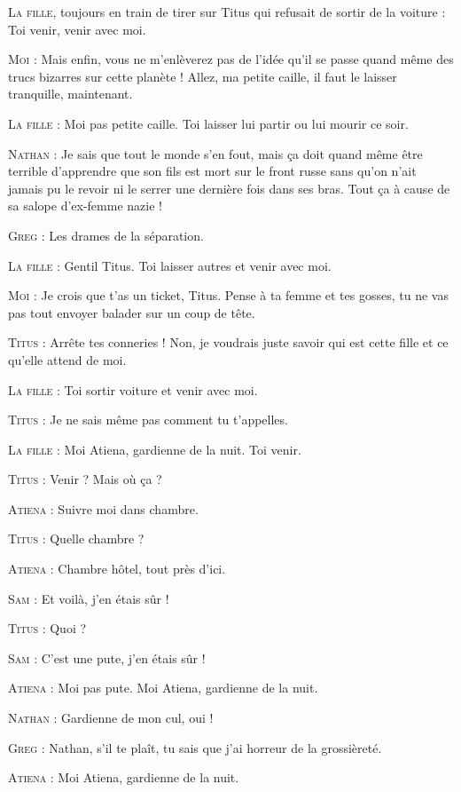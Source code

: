 \begin{dialogue}
\textsc{La fille}, toujours en train de tirer sur Titus qui refusait de sortir de la voiture : Toi venir, venir avec moi.

\textsc{Moi} : Mais enfin, vous ne m’enlèverez pas de l’idée qu’il se passe quand même des trucs bizarres sur cette planète ! Allez, ma petite caille, il faut le laisser tranquille, maintenant.

\textsc{La fille} : Moi pas petite caille. Toi laisser lui partir ou lui mourir ce soir.

\textsc{Nathan} : Je sais que tout le monde s’en fout, mais ça doit quand même être terrible d’apprendre que son fils est mort sur le front russe sans qu’on n’ait jamais pu le revoir ni le serrer une dernière fois dans ses bras. Tout ça à cause de sa salope d’ex-femme nazie !

\textsc{Greg} : Les drames de la séparation.

\textsc{La fille} : Gentil Titus. Toi laisser autres et venir avec moi.

\textsc{Moi} : Je crois que t’as un ticket, Titus. Pense à ta femme et tes gosses, tu ne vas pas tout envoyer balader sur un coup de tête.

\textsc{Titus} : Arrête tes conneries ! Non, je voudrais juste savoir qui est cette fille et ce qu’elle attend de moi.

\textsc{La fille} : Toi sortir voiture et venir avec moi.

\textsc{Titus} : Je ne sais même pas comment tu t’appelles.

\textsc{La fille} : Moi Atiena, gardienne de la nuit. Toi venir.

\textsc{Titus} : Venir ? Mais où ça ?

\textsc{Atiena} : Suivre moi dans chambre.

\textsc{Titus} : Quelle chambre ?

\textsc{Atiena} : Chambre hôtel, tout près d’ici.

\textsc{Sam} : Et voilà, j’en étais sûr !

\textsc{Titus} : Quoi ?

\textsc{Sam} : C’est une pute, j’en étais sûr !

\textsc{Atiena} : Moi pas pute. Moi Atiena, gardienne de la nuit.

\textsc{Nathan} : Gardienne de mon cul, oui !

\textsc{Greg} : Nathan, s’il te plaît, tu sais que j’ai horreur de la grossièreté.

\textsc{Atiena} : Moi Atiena, gardienne de la nuit.


\end{dialogue}
